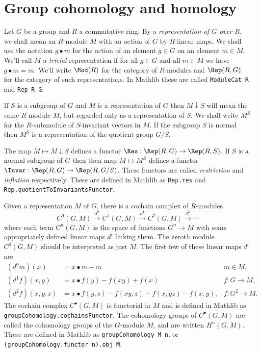 \section{Group cohomology and homology}

Let $G$ be a group and $R$ a commutative ring.
By a \emph{representation of $G$ over $R$},
we shall mean an $R$-module $M$ with an action of $G$ by $R$-linear maps.
We shall use the notation $g \bullet m$ for the action of an element $g \in G$
on an element $m \in M$.
We'll call $M$ a \emph{trivial} representation if for all $g \in G$ and all $m \in M$ we
have $g \bullet m = m$.
We'll write $\Mod(R)$ for the category of $R$-modules and $\Rep(R,G)$
for the category of such representations.
In Mathlib these are called \texttt{ModuleCat R} and \texttt{Rep R G}.

If $S$ is a subgroup of $G$ and $M$ is a representation of $G$
then $M \downarrow S$ will mean the same $R$-module $M$,
but regarded only as a representation of $S$.
We shall write $M^S$ for the $R$-submodule of $S$-invariant vectors in $M$.
If the subgroup $S$ is normal then $M^S$ is a representation of the quotient group $G/S$.

\begin{definition} \label{def:inflation restriction functors}
	\leanok
	\mathlibok
	The map $M \mapsto M \downarrow S$ defines a functor $\Res : \Rep(R,G) \to \Rep(R,S)$.
	If $S$ is a normal subgroup of $G$ then then map $M \mapsto M^S$ defines
	a functor $\Invar : \Rep(R,G) \to \Rep(R, G/S)$.
	These functors are called \emph{restriction} and \emph{inflation} respectively.
	These are defined in Mathlib as \texttt{Rep.res} and \texttt{Rep.quotientToInvariantsFunctor}.
\end{definition}


Given a representation $M$ of $G$, there is a cochain complex of $R$-modules
\[
	C^0(G,M) \stackrel{d^0}\to C^1(G,M)  \stackrel{d^1}\to C^2(G,M)  \stackrel{d^2}\to \cdots
\]
where each term $C^n(G,M)$ is the space of functions $G^n \to M$ with some appropriately defined
linear maps $d^i$ linking them.
The zeroth module $C^0(G,M)$ should be interpreted as just $M$.
The first few of these linear maps $d^i$ are
\begin{align*}
	(d^0 m)(x) &= x \bullet m - m
	& m \in M, \\
	(d^1 f)(x,y) &= x \bullet f(y) - f(xy) + f(x)
	& f : G \to M,\\
	(d^2 f)(x,y,z) &= x\bullet f(y,z) - f(xy,z) + f(x,yz) - f(x,y),
	& f : G^2 \to M.
\end{align*}
The cochain complex $C^\bullet(G,M)$ is functorial in $M$ and is defined in Mathlib as
\texttt{groupCohomology.cochainsFunctor}.
The cohomology groups of $C^\bullet(G,M)$ are called the cohomology groups of the
$G$-module $M$, and are written $H^n(G,M)$. These are defined in Mathlib as
\texttt{groupCohomology M n}, or \texttt{(groupCohomology.functor n).obj M}.

